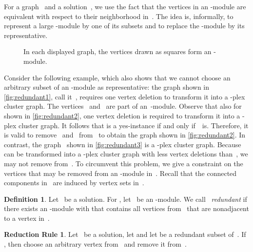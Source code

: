 \documentclass[12pt, a4paper, abstracton]{scrreprt}
\newcommand{\md}[1]{\mbox{-module}}
\newcommand{\pl}[1]{\mbox{-plex}}
\newcommand{\pcg}[1]{\pl #1 cluster graph}
\newcounter{theorem}
\theoremstyle{definition}
\newtheorem{rul}{Reduction Rule}[chapter]
\newtheorem{definition}{Definition}[chapter]
\theoremstyle{remark}
\begin{document}
For a graph~ and a solution~, we use the fact that the vertices in an \md X are equivalent with respect to their neighborhood in~. The idea is, informally, to represent a large \md X by one of its subsets and to replace the \md X by its representative.
\begin{figure}[t]
  \centering
    \hspace{1cm}
    \hspace{1.0cm}
    \caption{In each displayed graph, the vertices drawn as squares
      form an \md X.}
    \label{fig:redundant}
\end{figure}
Consider the following example, which also shows that we cannot choose an arbitrary subset of an \md X as representative: the graph shown in \autoref{fig:redundant1}, call it~, requires one vertex deletion to transform it into a \pcg 2. The vertices~ and~ are part of an~-module. Observe that also for~ shown in \autoref{fig:redundant2}, one vertex deletion is required to transform it into a \pcg2. It follows that  is a yes-instance if and only if~~is. Therefore, it is valid to remove~ and~ from~ to obtain the graph shown in \autoref{fig:redundant2}. In contrast, the graph~ shown in \autoref{fig:redundant3} is a \pcg2. Because  can be transformed into a \pcg 2 with less vertex deletions than~, we may not remove  from~. To circumvent this problem, we give a constraint on the vertices that may be removed from an \md X in~. Recall that the connected components in~ are induced by vertex sets in~.

\begin{definition}\label{redundant-def}
  Let~ be a solution. For , let~ be an \md X. We call~ \emph{redundant} if there exists an \md X  with  that contains all vertices from~ that are nonadjacent to a vertex in~.
\end{definition}

\begin{rul}\label{rul:goodconnected}
  Let~ be a solution, let  and let  be a redundant subset of~. If , then choose an arbitrary vertex from~ and remove it from~.
\end{rul}
\end{document}

